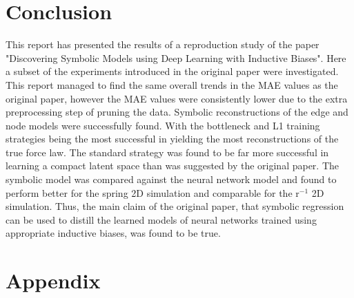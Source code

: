 \documentclass[11pt]{article}
\begin{document}


\section{Conclusion}
This report has presented the results of a reproduction study of the paper "Discovering Symbolic Models using Deep Learning with Inductive Biases". Here a subset of the experiments introduced in the original paper were investigated. This report managed to find the same overall trends in the MAE values as the original paper, however the MAE values were consistently lower due to the extra preprocessing step of pruning the data. Symbolic reconstructions of the edge and node models were successfully found. With the bottleneck and L1 training strategies being the most successful in yielding the most reconstructions of the true force law. The standard strategy was found to be far more successful in learning a compact latent space than was suggested by the original paper. The symbolic model was compared against the neural network model and found to perform better for the spring 2D simulation and comparable for the r$^{-1}$ 2D simulation. Thus, the main claim of the original paper, that symbolic regression can be used to distill the learned models of neural networks trained using appropriate inductive biases, was found to be true. 
    
\section{Appendix}
\end{document}
